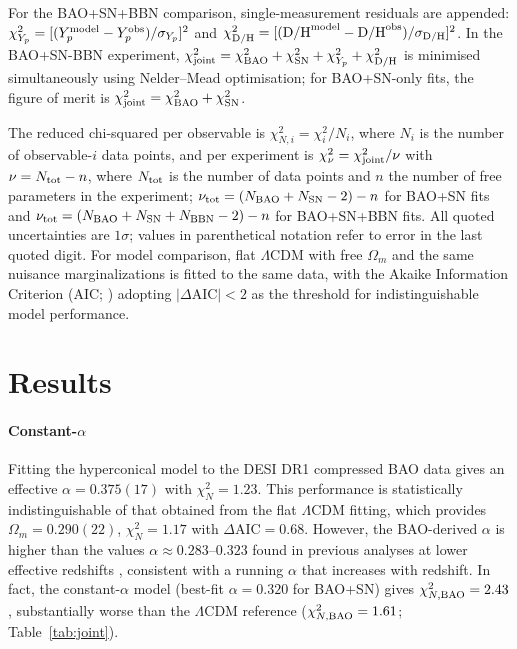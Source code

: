 ﻿\documentclass[3p,twocolumn]{elsarticle}
\begin{document}
For the BAO+SN+BBN comparison, single-measurement residuals are appended: $\chi^2_{Y_p}=[(Y_p^{\rm model}-Y_p^{\rm obs})/\sigma_{Y_p}]^2$ and $\chi^2_{\rm D/H}=[(\mathrm{D/H}^{\rm model}-\mathrm{D/H}^{\rm obs})/\sigma_{\rm D/H}]^2$. In the BAO+SN-BBN experiment, $\chi^2_{\rm joint}=\chi^2_{\rm BAO}+\chi^2_{\rm SN}+\chi^2_{Y_p}+\chi^2_{\rm D/H}$ is minimised simultaneously using Nelder--Mead optimisation; for BAO+SN-only fits, the figure of merit is $\chi^2_{\rm joint}=\chi^2_{\rm BAO}+\chi^2_{\rm SN}$. 

The reduced chi-squared per observable is $\chi^2_{N,i} =\chi_i^2/N_i$, where $N_i$ is the number of observable-$i$ data points, and per experiment is $\chi^2_\nu=\chi_{\rm joint}^2/\nu$ with $\nu=N_{\rm tot}-n$, where $N_{\rm tot}$ is the number of data points and $n$ the number of free parameters in the experiment; $\nu_{\rm tot}=(N_{\rm BAO}+N_{\rm SN}-2)-n$ for BAO+SN fits and $\nu_{\rm tot}=(N_{\rm BAO}+N_{\rm SN}+N_{\rm BBN}-2)-n$ for BAO+SN+BBN fits. All quoted uncertainties are $1\sigma$; values in parenthetical notation refer to error in the last quoted digit. For model comparison, flat $\Lambda$CDM with free $\Omega_m$ and the same nuisance marginalizations is fitted to the same data, with the Akaike Information Criterion (AIC; \cite{burnham2002model}) adopting $|\Delta\mathrm{AIC}|<2$ as the threshold for indistinguishable model performance.



\section{Results}\label{sec:results}

\paragraph{Constant-$\alpha$} Fitting the hyperconical model to the DESI DR1 compressed BAO data gives an effective $\alpha = 0.375(17)$ with $\chi^2_N=1.23$. This performance is statistically indistinguishable of that obtained from the flat $\Lambda$CDM fitting, which provides $\Omega_m=0.290(22)$, $\chi^2_N=1.17$ with $\Delta\mathrm{AIC}=0.68$. However, the BAO-derived $\alpha$ is higher than the values $\alpha\approx0.283$--$0.323$ found in previous analyses at lower effective redshifts \cite{monjo2017hyperconical, monjo2018projected, Monjo_2024}, consistent with a running $\alpha$ that increases with redshift. In fact, the constant-$\alpha$ model (best-fit $\alpha=0.320$ for BAO+SN) gives $\chi^2_{N,\rm BAO}=2.43$, substantially worse than the $\Lambda$CDM reference ($\chi^2_{N,\rm BAO}=1.61$; Table~\ref{tab:joint}). 
\end{document}
